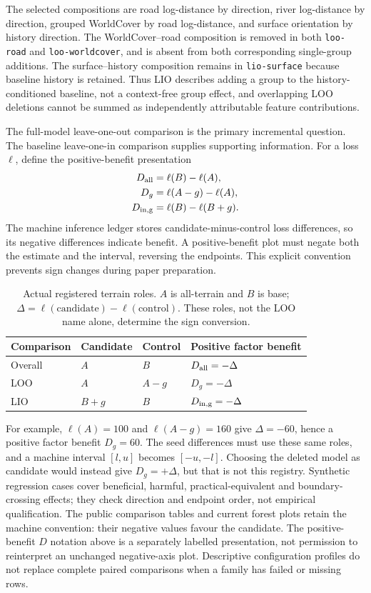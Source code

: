 \documentclass[11pt]{article}
\begin{document}
The selected compositions are road log-distance by direction, river
log-distance by direction, grouped WorldCover by road log-distance, and
surface orientation by history direction. The WorldCover--road composition
is removed in both \texttt{loo-road} and \texttt{loo-worldcover}, and is absent
from both corresponding single-group additions. The surface--history
composition remains in \texttt{lio-surface} because baseline history is
retained. Thus LIO describes adding a group to the history-conditioned
baseline, not a context-free group effect, and overlapping LOO deletions
cannot be summed as independently attributable feature contributions.

The full-model leave-one-out comparison is the primary incremental question.
The baseline leave-one-in comparison supplies supporting information. For a
loss \(\ell\), define the positive-benefit presentation
\begin{align}
 D_{\rm all}&=\ell(B)-\ell(A),\\
 D_g&=\ell(A-g)-\ell(A),\\
 D_{\rm in,g}&=\ell(B)-\ell(B+g).
\end{align}
The machine inference ledger stores candidate-minus-control loss differences,
so its negative differences indicate benefit. A positive-benefit plot must
negate both the estimate and the interval, reversing the endpoints. This
explicit convention prevents sign changes during paper preparation.

\begin{table}[htbp]
\centering\small
\caption{Actual registered terrain roles. \(A\) is all-terrain and \(B\)
is base; \(\Delta=\ell(\mathrm{candidate})-\ell(\mathrm{control})\).
These roles, not the LOO name alone, determine the sign conversion.}
\label{tab:terrain-sign-roles}
\begin{tabular}{llll}
\toprule Comparison & Candidate & Control & Positive factor benefit\\\midrule
Overall & \(A\) & \(B\) & \(D_{\rm all}=-\Delta\)\\
LOO & \(A\) & \(A-g\) & \(D_g=-\Delta\)\\
LIO & \(B+g\) & \(B\) & \(D_{\rm in,g}=-\Delta\)\\
\bottomrule
\end{tabular}
\end{table}
For example, \(\ell(A)=100\) and \(\ell(A-g)=160\) give
\(\Delta=-60\), hence a positive factor benefit \(D_g=60\).
The seed differences must use these same roles, and a machine interval
\([l,u]\) becomes \([-u,-l]\). Choosing the deleted model as candidate
would instead give \(D_g=+\Delta\), but that is not this registry.
Synthetic regression cases cover beneficial, harmful, practical-equivalent
and boundary-crossing effects; they check direction and endpoint order,
not empirical qualification.
The public comparison tables and current forest plots retain the machine
convention: their negative values favour the candidate. The positive-benefit
\(D\) notation above is a separately labelled presentation, not permission
to reinterpret an unchanged negative-axis plot. Descriptive configuration
profiles do not replace complete paired comparisons when a family has failed
or missing rows.
\end{document}
